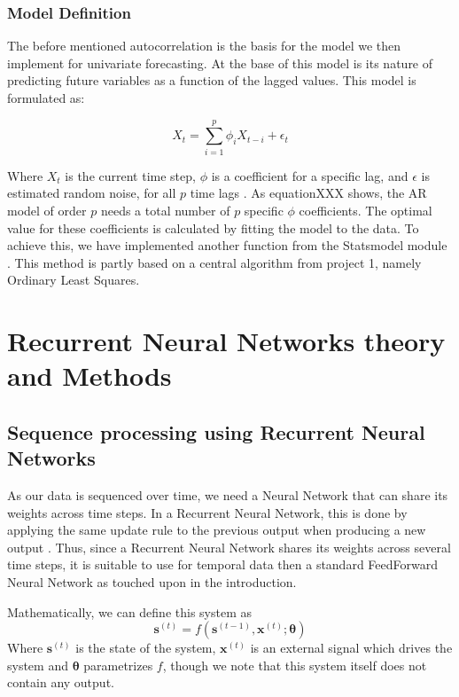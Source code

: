 \documentclass
[twocolumn,
secnumarabic,
nobibnotes,
aps,
prl,
reprint,
groupedaddress,
amsmath,
amssymb,
]{revtex4-2}
\begin{document}
\subsubsection{Model Definition}

The before mentioned autocorrelation is the basis for the model we then implement for univariate forecasting. At the base of this model is its nature of predicting future variables as a function of the lagged values. This model is formulated as:

\[
X_t = \sum_{i=1}^{p} \phi_i X_{t-i} + \epsilon_{t}
\]

Where $X_t$ is the current time step, $\phi$ is a coefficient for a specific lag, and $\epsilon$ is estimated random noise, for all $p$ time lags \cite{Korstanje2021}. As equationXXX shows, the AR model of order $p$ needs a total number of $p$ specific $\phi$ coefficients. The optimal value for these coefficients is calculated by fitting the model to the data. To achieve this, we have implemented another function from the Statsmodel module \cite{seabold2010statsmodels}. This method is partly based on a central algorithm from project 1, namely Ordinary Least Squares. 

\section{Recurrent Neural Networks theory and Methods}

\subsection{Sequence processing using Recurrent Neural Networks}
As our data is sequenced over time, we need a Neural Network that can share its weights across time steps. In a Recurrent Neural Network, this is done by applying the same update rule to the previous output when producing a new output \cite{Goodfellow2016}. Thus, since a Recurrent Neural Network shares its weights across several time steps, it is suitable to use for temporal data then a standard FeedForward Neural Network as touched upon in the introduction.

Mathematically, we can define this system as
\begin{equation}
  \nonumber
  \bm{s}^{(t)} = f(\bm{s}^{(t-1)},\bm{x}^{(t)};\bm{\theta})
\end{equation}
Where $\bm{s}^{(t)}$ is the state of the system, $\bm{x}^{(t)}$ is an external signal which drives the system and $\bm{\theta}$ parametrizes $f$, though we note that this system itself does not contain any output. 
\end{document}
